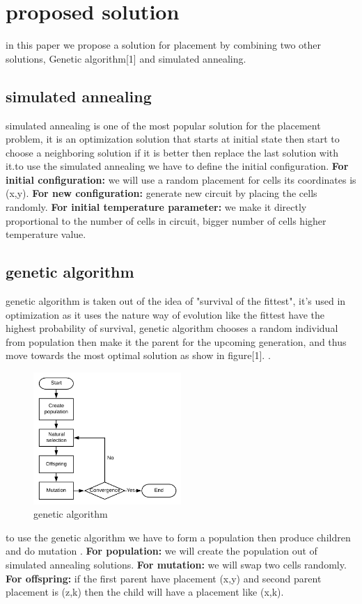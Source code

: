 \documentclass[conference]{IEEEtran}
\begin{document}
\section{proposed solution}
in this paper we propose a solution for placement by combining two
other solutions, Genetic algorithm[1] and simulated annealing.
\subsection{simulated annealing}
simulated annealing is one of the most popular solution for the placement problem, it is an optimization solution that starts at initial state then start to choose a neighboring solution if it is better then replace the last solution with it.to use the simulated annealing we have to define the initial configuration.
\newline
\textbf{For initial configuration:} we will use a random placement for cells its coordinates is (x,y).
\newline
\textbf{For new configuration:} generate new circuit by placing the cells randomly.
\newline
\textbf{For initial temperature parameter:} we make it directly proportional to the number of cells in circuit, bigger number of cells higher temperature value.
\subsection{genetic algorithm}
genetic algorithm is taken out of the idea of "survival of the fittest", it's used in optimization as it uses the nature way of evolution like the fittest have the highest probability of survival, genetic algorithm chooses a random individual from population then make it the parent for the upcoming generation, and thus move towards the most optimal solution as show in figure[1].
.
 \begin{figure}[h]
    \includegraphics[width=0.5\textwidth]{images/gene.png}
    \caption{genetic algorithm}
\end{figure}
\newline
to use the genetic algorithm we have to form a population then produce children and do mutation .
\newline
\textbf{For population:} we will create the population out of simulated annealing solutions.
\textbf{For mutation:} we will swap two cells randomly.
\newline
\textbf{For offspring:} if the first parent have placement (x,y) and second parent placement is (z,k) then the child will have a placement like (x,k).
\end{document}
